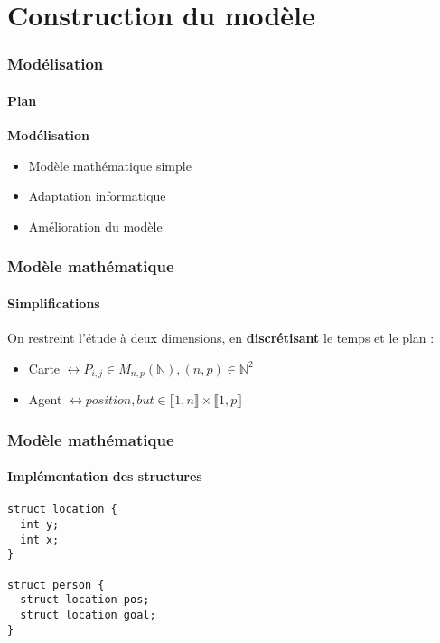 \section{Construction du modèle}



\begin{frame}
\frametitle{Modélisation}
\framesubtitle{Plan}
    \textbf{Modélisation}
    \begin{itemize}
        \item <2-> Modèle mathématique simple
        \item <3-> Adaptation informatique
        \item <4-> Amélioration du modèle
    \end{itemize}
\end{frame}



\begin{frame}
\frametitle{Modèle mathématique}
\framesubtitle{Simplifications}

On restreint l’étude à deux dimensions, en \textbf{discrétisant} le temps et le plan :
\bigskip


\begin{itemize}
    \item <2-> Carte $\leftrightarrow P_{i,j} \in M_{n,p}(\mathbb{N}), (n, p) \in \mathbb{N}^2$
    \item <3->  Agent $ \leftrightarrow position, but \in \llbracket 1, n\rrbracket \times \llbracket 1, p\rrbracket $
\end{itemize}

\end{frame}



\begin{frame}[fragile]
\frametitle{Modèle mathématique}
\framesubtitle{Implémentation des structures}

\begin{code}
\begin{verbatim}
struct location {
  int y;
  int x;
}

struct person {
  struct location pos;
  struct location goal;
}
\end{verbatim}
\end{code}
\end{frame}



